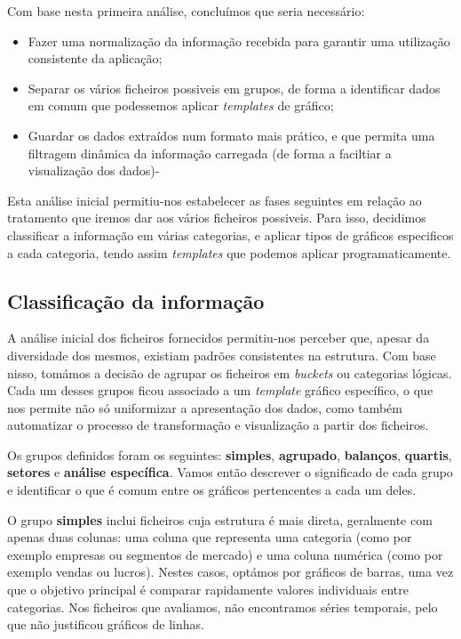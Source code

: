 Com base nesta primeira análise, concluímos que seria necessário:
\begin{itemize}
    \item Fazer uma normalização da informação recebida para garantir uma utilização consistente da aplicação;
    \item Separar os vários ficheiros possiveis em grupos, de forma a identificar dados em comum que podessemos aplicar \textit{templates} de gráfico;
    \item Guardar os dados extraídos num formato mais prático, e que permita uma filtragem dinâmica da informação carregada (de forma a faciltiar a visualização dos dados)-
\end{itemize}

Esta análise inicial permitiu-nos estabelecer as fases seguintes em relação ao tratamento que iremos dar aos vários ficheiros possiveis. Para isso, decidimos classificar a informação em várias categorias, e aplicar tipos de gráficos especificos a cada categoria, tendo assim \textit{templates} que podemos aplicar programaticamente. 

\subsection{Classificação da informação}

A análise inicial dos ficheiros fornecidos permitiu-nos perceber que, apesar da diversidade dos mesmos,  existiam padrões consistentes na estrutura. Com base nisso, tomámos a decisão de agrupar os ficheiros em \textit{buckets} ou categorias lógicas. Cada um desses grupos ficou associado a um \textit{template} gráfico específico, o que nos permite não só uniformizar a apresentação dos dados, como também automatizar o processo de transformação e visualização a partir dos ficheiros.

Os grupos definidos foram os seguintes: \textbf{simples}, \textbf{agrupado}, \textbf{balanços}, \textbf{quartis}, \textbf{setores} e \textbf{análise específica}. Vamos então descrever o significado de cada grupo e identificar o que é comum entre os gráficos pertencentes a cada um deles.

O grupo \textbf{simples} inclui ficheiros cuja estrutura é mais direta, geralmente com apenas duas colunas: uma coluna que representa uma categoria (como por exemplo empresas ou segmentos de mercado) e uma coluna numérica (como por exemplo vendas ou lucros). Nestes casos, optámos por gráficos de barras, uma vez que o objetivo principal é comparar rapidamente valores individuais entre categorias. Nos ficheiros que avaliamos, não encontramos séries temporais, pelo que não justificou gráficos de linhas.

